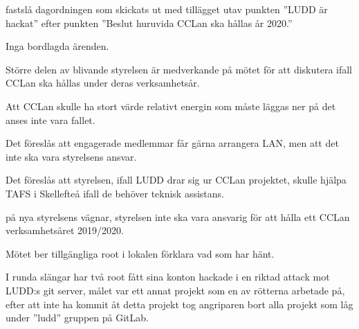 \documentclass{protokoll}
\begin{document}
\newpage  


\begin{beslut}
     \att fastslå dagordningen som skickats ut med tillägget utav punkten 
     ''LUDD är hackat'' efter punkten ''Beslut huruvida CCLan ska hållas år
     2020.''
\end{beslut}

Inga bordlagda ärenden.

Större delen av blivande styrelsen är medverkande på mötet för att diskutera
ifall CCLan ska hållas under deras verksamhetsår. 

Att CCLan skulle ha stort värde relativt energin som måste läggas ner på det
anses inte vara fallet. 

Det föreslås att engagerade medlemmar får gärna arrangera LAN, men att det inte
ska vara styrelsens ansvar.

Det föreslås att styrelsen, ifall LUDD drar sig ur CCLan projektet, skulle
hjälpa TAFS i Skellefteå ifall de behöver teknisk assistans. 

\begin{beslut}
  \att på nya styrelsens vägnar, styrelsen inte ska vara ansvarig för att hålla
  ett CCLan verksamhetsåret 2019/2020.
\end{beslut}

Mötet ber tillgängliga root i lokalen förklara vad som har hänt.  

I runda slängar har två root fått sina konton hackade i en riktad attack mot
LUDD:s git server, målet var ett annat projekt som en av rötterna arbetade på,
efter att inte ha kommit åt detta projekt tog angriparen bort alla projekt
som låg under ''ludd'' gruppen på GitLab. 
\end{document}
